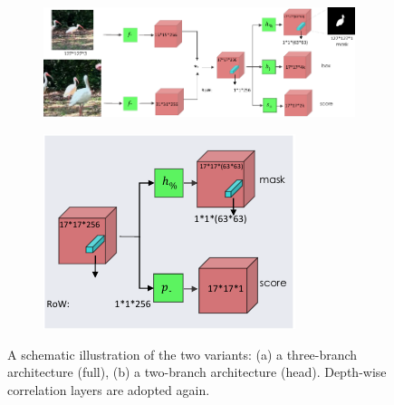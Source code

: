 \begin{figure}[t]
    \centering
    \begin{subfigure}[b]{0.68\textwidth}
        \centering
        \includegraphics[width=\textwidth]{figures/theoretical_foundations/siam_mask_architecture_3_branch.pdf}
        \caption[]{}
    \end{subfigure}
    \hfill
    \begin{subfigure}[b]{0.31\textwidth}
        \centering
        \includegraphics[width=\textwidth]{figures/theoretical_foundations/siam_mask_architecture_2_branch_head.pdf}
        \caption[]{}
    \end{subfigure}
    \caption[ architecture]{A schematic illustration of the two  variants: (a) a three-branch architecture (full), (b) a two-branch architecture (head). Depth-wise correlation layers are adopted again. }
    \label{fig:SiamMaskArchitecture}
\end{figure}

